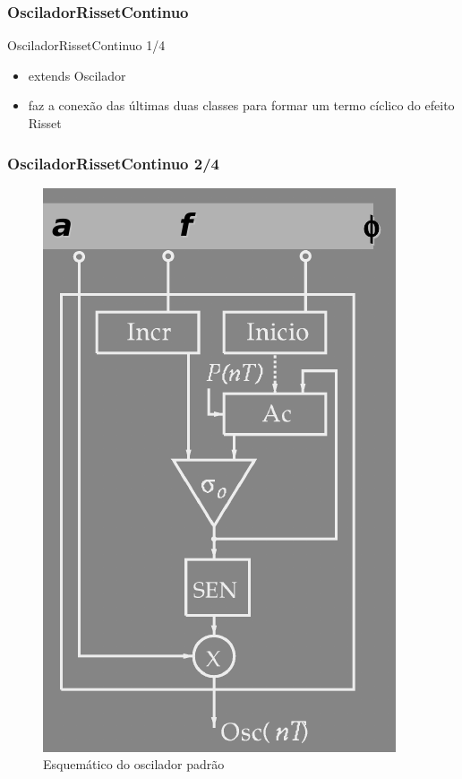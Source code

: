 \documentclass{beamer}
\begin{document}
\subsubsection{OsciladorRissetContinuo}
\begin{frame}{OsciladorRissetContinuo 1/4}
\begin{itemize}
	\item extends Oscilador
	\item faz a conexão das últimas duas classes para formar um termo
	cíclico do efeito Risset
\end{itemize}
\end{frame}

\begin{frame}
 \frametitle{OsciladorRissetContinuo 2/4}
 \begin{figure}
  \includegraphics[scale=0.3]{./images/oscilador.png}
  \caption{Esquemático do oscilador padrão}
   \end{figure}
\end{frame}
\end{document}
